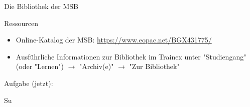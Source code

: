 \documentclass{beamer}
\begin{document}
\begin{frame}{Die Bibliothek der MSB}

\begin{block}{Ressourcen}
\begin{itemize}(
    \item 
    Online-Katalog der MSB: \url{https://www.eopac.net/BGX431775/}
    \item 
    Ausführliche Informationen zur Bibliothek im Trainex unter "Studiengang" (oder "Lernen") \(\rightarrow\) "Archiv(e)" \(\rightarrow\) "Zur Bibliothek"
\end{itemize} 
\end{block}

\begin{block}{Aufgabe (jetzt):}

Su

\end{block}

\end{frame}














\end{document}

